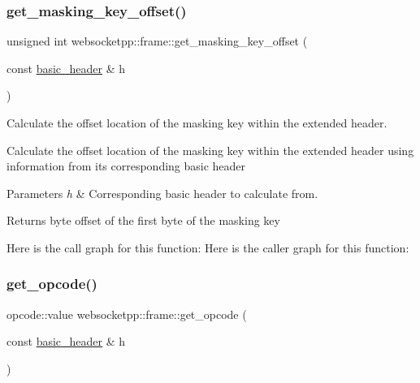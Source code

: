 \subsubsection{\texorpdfstring{get\+\_\+masking\+\_\+key\+\_\+offset()}{get\_masking\_key\_offset()}}
{\footnotesize\ttfamily unsigned int websocketpp\+::frame\+::get\+\_\+masking\+\_\+key\+\_\+offset (\begin{DoxyParamCaption}\item[{const \mbox{\hyperlink{structwebsocketpp_1_1frame_1_1basic__header}{basic\+\_\+header}} \&}]{h }\end{DoxyParamCaption})\hspace{0.3cm}{\ttfamily [inline]}}



Calculate the offset location of the masking key within the extended header. 

Calculate the offset location of the masking key within the extended header using information from its corresponding basic header


\begin{DoxyParams}{Parameters}
{\em h} & Corresponding basic header to calculate from.\\
\hline
\end{DoxyParams}
\begin{DoxyReturn}{Returns}
byte offset of the first byte of the masking key 
\end{DoxyReturn}
Here is the call graph for this function\+:
Here is the caller graph for this function\+:
\mbox{\label{namespacewebsocketpp_1_1frame_a235192baaf86f38158dc33f178c04661}} 
\subsubsection{\texorpdfstring{get\+\_\+opcode()}{get\_opcode()}}
{\footnotesize\ttfamily opcode\+::value websocketpp\+::frame\+::get\+\_\+opcode (\begin{DoxyParamCaption}\item[{const \mbox{\hyperlink{structwebsocketpp_1_1frame_1_1basic__header}{basic\+\_\+header}} \&}]{h }\end{DoxyParamCaption})\hspace{0.3cm}{\ttfamily [inline]}}



